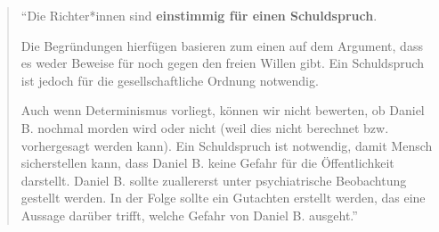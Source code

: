 \documentclass[
  a4paper,
]{report}
\begin{document}
\begin{quote}
``Die Richter*innen sind \textbf{einstimmig für einen Schuldspruch}.

Die Begründungen hierfügen basieren zum einen auf dem Argument, dass es weder Beweise für noch gegen den freien Willen gibt. Ein Schuldspruch ist jedoch für die gesellschaftliche Ordnung notwendig.

Auch wenn Determinismus vorliegt, können wir nicht bewerten, ob Daniel B. nochmal morden wird oder nicht (weil dies nicht berechnet bzw. vorhergesagt werden kann). Ein Schuldspruch ist notwendig, damit Mensch sicherstellen kann, dass Daniel B. keine Gefahr für die Öffentlichkeit darstellt. Daniel B. sollte zuallererst unter psychiatrische Beobachtung gestellt werden. In der Folge sollte ein Gutachten erstellt werden, das eine Aussage darüber trifft, welche Gefahr von Daniel B. ausgeht.''
\end{quote}

  
\end{document}
